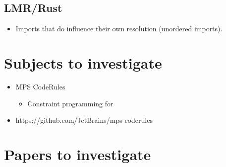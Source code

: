       \subsection{LMR/Rust}

        \begin{itemize}
          \item Imports that do influence their own resolution (unordered imports).
        \end{itemize}

  \section{Subjects to investigate}

    \begin{itemize}
      \item MPS CodeRules
      \begin{itemize}
        \item Constraint programming for 
      \end{itemize}
      \item https://github.com/JetBrains/mps-coderules
    \end{itemize}

  \section{Papers to investigate}

